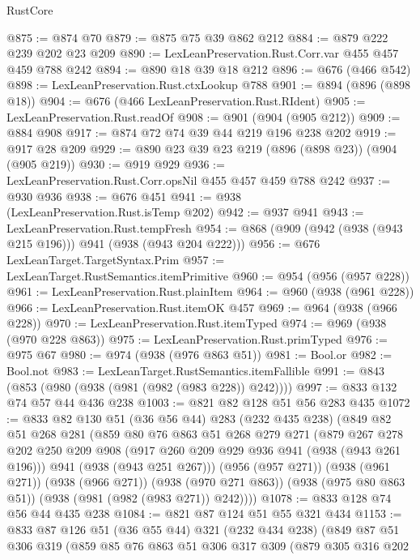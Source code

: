 \begin{lexlean}{RustCore}
\begin{coremodule}
@875 := @874 @70
@879 := @875 @75 @39 @862 @212
@884 := @879 @222 @239 @202 @23 @209
@890 := LexLeanPreservation.Rust.Corr.var @455 @457 @459 @788 @242
@894 := @890 @18 @39 @18 @212
@896 := @676 (@466 @542)
@898 := LexLeanPreservation.Rust.ctxLookup @788
@901 := @894 (@896 (@898 @18))
@904 := @676 (@466 LexLeanPreservation.Rust.RIdent)
@905 := LexLeanPreservation.Rust.readOf
@908 := @901 (@904 (@905 @212))
@909 := @884 @908
@917 := @874 @72 @74 @39 @44 @219 @196 @238 @202
@919 := @917 @28 @209
@929 := @890 @23 @39 @23 @219 (@896 (@898 @23)) (@904 (@905 @219))
@930 := @919 @929
@936 := LexLeanPreservation.Rust.Corr.opsNil @455 @457 @459 @788 @242
@937 := @930 @936
@938 := @676 @451
@941 := @938 (LexLeanPreservation.Rust.isTemp @202)
@942 := @937 @941
@943 := LexLeanPreservation.Rust.tempFresh
@954 := @868 (@909 (@942 (@938 (@943 @215 @196))) @941 (@938 (@943 @204 @222)))
@956 := @676 LexLeanTarget.TargetSyntax.Prim
@957 := LexLeanTarget.RustSemantics.itemPrimitive
@960 := @954 (@956 (@957 @228))
@961 := LexLeanPreservation.Rust.plainItem
@964 := @960 (@938 (@961 @228))
@966 := LexLeanPreservation.Rust.itemOK @457
@969 := @964 (@938 (@966 @228))
@970 := LexLeanPreservation.Rust.itemTyped
@974 := @969 (@938 (@970 @228 @863))
@975 := LexLeanPreservation.Rust.primTyped
@976 := @975 @67
@980 := @974 (@938 (@976 @863 @51))
@981 := Bool.or
@982 := Bool.not
@983 := LexLeanTarget.RustSemantics.itemFallible
@991 := @843 (@853 (@980 (@938 (@981 (@982 (@983 @228)) @242))))
@997 := @833 @132 @74 @57 @44 @436 @238
@1003 := @821 @82 @128 @51 @56 @283 @435
@1072 := @833
    @82
    @130
    @51
    (@36 @56 @44)
    @283
    (@232 @435 @238)
    (@849
      @82
      @51
      @268
      @281
      (@859
        @80
        @76
        @863
        @51
        @268
        @279
        @271
        (@879
          @267
          @278
          @202
          @250
          @209
          @908
          (@917 @260 @209 @929 @936 @941 (@938 (@943 @261 @196)))
          @941
          (@938 (@943 @251 @267)))
        (@956 (@957 @271))
        (@938 (@961 @271))
        (@938 (@966 @271))
        (@938 (@970 @271 @863))
        (@938 (@975 @80 @863 @51))
        (@938 (@981 (@982 (@983 @271)) @242))))
@1078 := @833 @128 @74 @56 @44 @435 @238
@1084 := @821 @87 @124 @51 @55 @321 @434
@1153 := @833
    @87
    @126
    @51
    (@36 @55 @44)
    @321
    (@232 @434 @238)
    (@849
      @87
      @51
      @306
      @319
      (@859
        @85
        @76
        @863
        @51
        @306
        @317
        @309
        (@879
          @305
          @316
          @202

\end{coremodule}
\end{lexlean}
